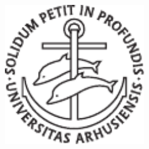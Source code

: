 \begin{titlepage}
	\begin{addmargin}[-1cm]{-3cm}
    \begin{center}
        \large  

        \hfill

        \vfill

        \begingroup
            \color{Maroon}\spacedallcaps{\myTitle} \\ \bigskip
        \endgroup
        \emph{\mySubtitle} \\ \medskip

        \spacedlowsmallcaps{\myShortNames}\\

        \vfill

        \includegraphics[width=6cm]{gfx/au-logo} \\ \medskip

        \myDegree \\ \medskip
        \myDepartment \\                            
        \myFaculty \\
        \myUni \\ \bigskip

        \myTime

        \vfill                      

    \end{center}  
  \end{addmargin}       
\end{titlepage}   
